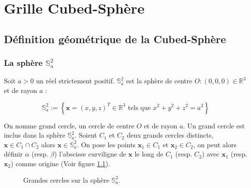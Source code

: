 
\chapter{Grille Cubed-Sphère}

\section{Définition géométrique de la Cubed-Sphère}

\subsection{La sphère $\mathbb{S}_a^2$}

Soit $a > 0$ un réel strictement positif. $\mathbb{S}_a^2$ est la sphère de centre $O : (0,0,0) \in \mathbb{R}^3$ et de rayon $a$ :

\begin{equation}
\mathbb{S}_a^2 := \left\lbrace
\mathbf{x} = (x,y,z)^T \in \mathbb{R}^3 \text{ tels que } x^2+y^2+z^2 = a^2
\right\rbrace
\end{equation} 

On nomme grand cercle, un cercle de centre $O$ et de rayon $a$. Un grand cercle est inclus dans la sphère $\mathbb{S}_a^2$.
Soient $C_1$ et $C_2$ deux grands cercles distincts, $\mathbf{x} \in C_1 \cap C_2$ alors $\mathbf{x} \in \mathbb{S}_a^2$.
On pose les points $\mathbf{x}_1 \in C_1$ et $\mathbf{x}_2 \in C_2$, on peut alors définir $\alpha$ (resp. $\beta$) l’abscisse curviligne de $\mathbf{x}$ le long de $C_1$ (resp. $C_2$) avec $\mathbf{x}_1$ (resp. $\mathbf{x}_2$) comme origine (Voir figure \ref{fig: grands cercles}).


\begin{figure}[ht]
\begin{center}
\end{center}
\caption{Grandes cercles sur la sphère $\mathbb{S}_a^2$.}
\label{fig: grands cercles}
\end{figure}

